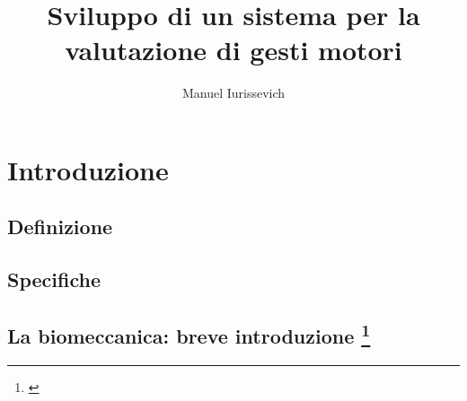 \documentclass [10pt, a4paper, onecolumn, oneside] {scrreprt}
\title{Sviluppo di un sistema per la valutazione di gesti motori}
\author{Manuel Iurissevich}
\date{} %
\numberwithin{endnote}{chapter}
\begin{document}
\maketitle

\newcommand{\iic}{{\relsize{-1} I$^2$C}}
\newcommand{\usb}{{\relsize{-1} {USB}}}
\newcommand{\sda}{{\relsize{-1} {SDA}}}
\newcommand{\scl}{{\relsize{-1} {SCL}}}
\newcommand{\vcc}{{\relsize{-1} \(V_{CC}\)}}
\newcommand{\master}{\textit{master}}
\newcommand{\slave}{\textit{slave}}
\newcommand{\Ack}{\textit{acknowledge}}
\newcommand{\ack}{\relsize{-1}{ACK}}
\newcommand{\pullup}{\textit{pull-up}}














	
\setcounter{tocdepth}{2}
\tableofcontents
\vfill
\thispagestyle{empty}
\eject


\newpage
\thispagestyle{empty}
\mbox{}





\chapter{Introduzione} \label{cap:intro}
		 \vfill\eject
	\section{Definizione} \label{sez:defnizione}
		 \vfill
	\section{Specifiche} \label{sez:specifiche}
		 \vfill
	\section {La biomeccanica: breve introduzione
	  \texorpdfstring{\footnote{ \cite{cit:donskoi}}}{(cit)}}
	  \label{sez:biomeccanica}
		 \vfill
\end{document}
